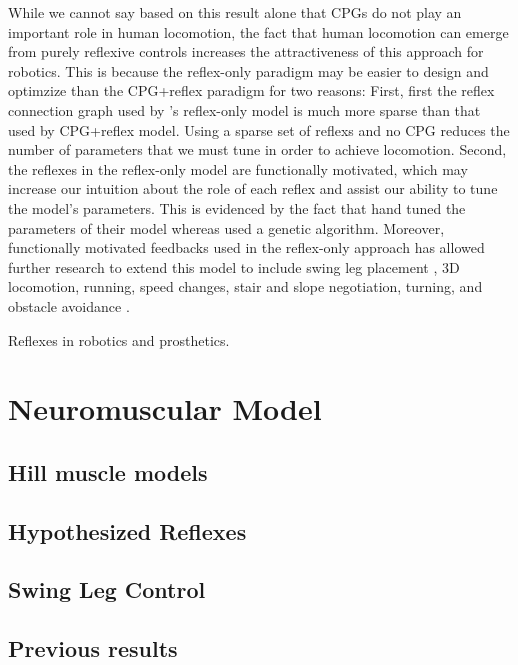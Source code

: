 While we cannot say based on this result alone that CPGs do not play an
important role in human locomotion, the fact that human locomotion can emerge
from purely reflexive controls increases the attractiveness of this approach for
robotics. This is because the reflex-only paradigm may be easier to design and
optimzize than the CPG+reflex paradigm for two reasons: First, first the reflex
connection graph used by \citet{geyer2010muscle}'s reflex-only model is
much more sparse than that used by \citet{ogihara2001generation} CPG+reflex
model. Using a sparse set of reflexs and no CPG reduces the number of parameters
that we must tune in order to achieve locomotion. Second, the reflexes in the
reflex-only model are functionally motivated, which may increase our intuition
about the role of each reflex and assist our ability to tune the model's
parameters. This is evidenced by the fact that \citeauthor{geyer2010muscle} hand
tuned the parameters of their model whereas \citeauthor{ogihara2001generation}
used a genetic algorithm. Moreover, functionally motivated feedbacks used in the
reflex-only approach has allowed further research to extend this model to
include swing leg placement \citep{desai2013muscle}, 3D locomotion, running,
speed changes, stair and slope negotiation, turning, and obstacle avoidance
\citep{song2015neural}.  
 
Reflexes in robotics and prosthetics.

\section{Neuromuscular Model}

\subsection{Hill muscle models}
\subsection{Hypothesized Reflexes}
\subsection{Swing Leg Control}
\subsection{Previous results}
